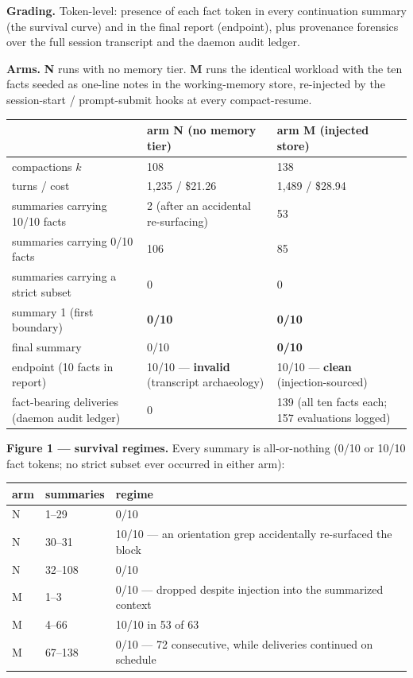 \documentclass[11pt]{article}
\begin{document}
\textbf{Grading.} Token-level: presence of each fact token in every
continuation summary (the survival curve) and in the final report
(endpoint), plus provenance forensics over the full session transcript
and the daemon audit ledger.

\textbf{Arms.} \textbf{N} runs with no memory tier. \textbf{M} runs the identical
workload with the ten facts seeded as one-line notes in the
working-memory store, re-injected by the session-start / prompt-submit
hooks at every compact-resume.

\begin{table}[h]
\centering
\small
\begin{tabularx}{\textwidth}{@{}p{5.4cm}YY@{}}
\toprule
 & \textbf{arm N (no memory tier)} & \textbf{arm M (injected store)} \\
\midrule
compactions $k$ & 108 & 138 \\
turns / cost & 1,235 / \$21.26 & 1,489 / \$28.94 \\
summaries carrying 10/10 facts & 2 (after an accidental re-surfacing) & 53 \\
summaries carrying 0/10 facts & 106 & 85 \\
summaries carrying a strict subset & 0 & 0 \\
summary 1 (first boundary) & \textbf{0/10} & \textbf{0/10} \\
final summary & 0/10 & \textbf{0/10} \\
endpoint (10 facts in report) & 10/10 --- \textbf{invalid} (transcript archaeology) & 10/10 --- \textbf{clean} (injection-sourced) \\
fact-bearing deliveries (daemon audit ledger) & 0 & 139 (all ten facts each; 157 evaluations logged) \\
\bottomrule
\end{tabularx}
\end{table}

\textbf{Figure 1 --- survival regimes.} Every summary is all-or-nothing
(0/10 or 10/10 fact tokens; no strict subset ever occurred in either
arm):

\begin{table}[h]
\centering
\small
\begin{tabularx}{\textwidth}{@{}llY@{}}
\toprule
\textbf{arm} & \textbf{summaries} & \textbf{regime} \\
\midrule
N & 1--29 & 0/10 \\
N & 30--31 & 10/10 --- an orientation grep accidentally re-surfaced the block \\
N & 32--108 & 0/10 \\
M & 1--3 & 0/10 --- dropped despite injection into the summarized context \\
M & 4--66 & 10/10 in 53 of 63 \\
M & 67--138 & 0/10 --- 72 consecutive, while deliveries continued on schedule \\
\bottomrule
\end{tabularx}
\end{table}
\end{document}
